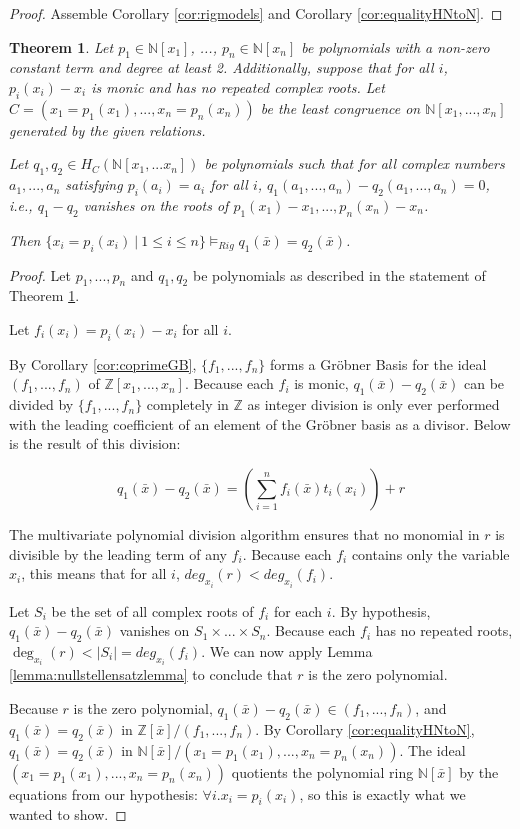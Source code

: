 \documentclass{msthesis}
\newtheorem{theorem}{Theorem}[section]
\theoremstyle{definition}
\newcommand{\ints}{\mathbb{Z}}
\newcommand{\nat}{\mathbb{N}}
\begin{document}
\begin{proof}
    Assemble Corollary \ref{cor:rigmodels} and Corollary \ref{cor:equalityHNtoN}.
\end{proof}

\begin{theorem}\label{thm:mvrigiso}
    Let $p_1 \in \nat[x_1]$, ..., $p_n \in \nat[x_n]$ be polynomials with a non-zero constant term and degree at least 2.  Additionally, suppose that for all $i$, $p_i(x_i) - x_i$ is monic and has no repeated complex roots.  Let $C = (x_1 = p_1(x_1), ..., x_n = p_n(x_n))$ be the least congruence on $\nat[x_1, ..., x_n]$ generated by the given relations.
    
    Let $q_1, q_2 \in H_C(\nat[x_1, ... x_n])$ be polynomials such that for all complex numbers $a_1, ..., a_n$ satisfying $p_i(a_i) = a_i$ for all $i$, $q_1(a_1, ..., a_n) - q_2(a_1, ..., a_n) = 0$, i.e., $q_1 - q_2$ vanishes on the roots of $p_1(x_1) - x_1, ..., p_n(x_n) - x_n$.

    Then $\{x_i = p_i(x_i)\ |\ 1 \le i \le n\} \models_{Rig} q_1(\bar{x}) = q_2(\bar{x})$.
\end{theorem}

\begin{proof}
    Let $p_1, ..., p_n$ and $q_1, q_2$ be polynomials as described in the statement of Theorem \ref{thm:mvrigiso}.

    Let $f_i(x_i) = p_i(x_i) - x_i$ for all $i$.
    
    By Corollary \ref{cor:coprimeGB}, $\{f_1, ..., f_n\}$ forms a Gr\"obner Basis for the ideal $(f_1, ..., f_n)$ of $\ints[x_1, ..., x_n]$.  Because each $f_i$ is monic, $q_1(\bar{x}) - q_2(\bar{x})$ can be divided by $\{f_1, ..., f_n\}$ completely in $\ints$ as integer division is only ever performed with the leading coefficient of an element of the Gr\"obner basis as a divisor.  Below is the result of this division:

    \[ q_1(\bar{x}) - q_2(\bar{x}) = \left(\sum_{i=1}^nf_i(\bar{x})t_i(x_i)\right) + r\]
    
    The multivariate polynomial division algorithm ensures that no monomial in $r$ is divisible by the leading term of any $f_i$.  Because each $f_i$ contains only the variable $x_i$, this means that for all $i$, $deg_{x_i}(r) < deg_{x_i}(f_i)$.

    Let $S_i$ be the set of all complex roots of $f_i$ for each $i$.  By hypothesis, $q_1(\bar{x}) - q_2(\bar{x})$ vanishes on $S_1 \times ... \times S_n$.  Because each $f_i$ has no repeated roots, $\deg_{x_i}(r) < |S_i| = deg_{x_i}(f_i)$.  We can now apply Lemma \ref{lemma:nullstellensatzlemma} to conclude that $r$ is the zero polynomial.

    Because $r$ is the zero polynomial, $q_1(\bar{x}) - q_2(\bar{x}) \in (f_1, ..., f_n)$, and $q_1(\bar{x}) = q_2(\bar{x})$ in $\ints[\bar{x}]/(f_1, ..., f_n)$.  By Corollary \ref{cor:equalityHNtoN}, $q_1(\bar{x}) = q_2(\bar{x})$ in $\nat[\bar{x}]/(x_1 = p_1(x_1), ..., x_n=p_n(x_n))$.  The ideal $(x_1 = p_1(x_1), ..., x_n=p_n(x_n))$ quotients the polynomial ring $\nat[\bar{x}]$ by the equations from our hypothesis: $\forall i. x_i=p_i(x_i)$, so this is exactly what we wanted to show.
\end{proof}
\end{document}
